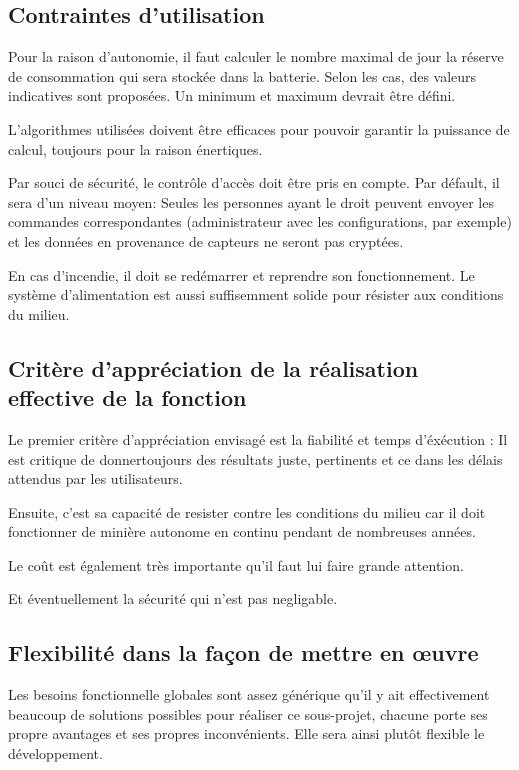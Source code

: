     \subsection{Contraintes d'utilisation}
    
		Pour la raison d'autonomie, il faut calculer le nombre maximal de jour la réserve de consommation qui sera stockée dans la batterie. Selon les cas, des valeurs indicatives sont proposées. Un minimum et maximum devrait être défini.  

		L'algorithmes utilisées doivent être efficaces pour pouvoir garantir la puissance de calcul, toujours pour la raison énertiques.
				
		Par souci de sécurité, le contrôle d’accès doit être pris en compte. Par défault, il sera d'un niveau moyen: Seules les personnes ayant le droit peuvent envoyer les commandes correspondantes (administrateur avec les configurations, par exemple) et les données en provenance de capteurs ne seront pas cryptées.
    
		En cas d'incendie, il doit se redémarrer et reprendre son fonctionnement. Le système d'alimentation est aussi suffisemment solide pour résister aux conditions du milieu.

    \subsection{Critère d'appréciation de la réalisation effective de la fonction} 
	Le premier critère d'appréciation envisagé est la fiabilité et temps d'éxécution : Il est critique de donnertoujours des résultats juste, pertinents et ce dans les délais attendus par les utilisateurs. 

	Ensuite, c'est sa capacité de resister contre les conditions du milieu car il doit fonctionner de minière autonome en continu pendant de nombreuses années.

	Le coût est également très importante qu'il faut lui faire grande attention.

	Et éventuellement la sécurité qui n'est pas negligable.
      
    \subsection{Flexibilité dans la façon de mettre en œuvre}
	Les besoins fonctionnelle globales sont assez générique qu'il y ait effectivement beaucoup de solutions possibles pour réaliser ce sous-projet, chacune porte ses propre avantages et ses propres inconvénients. Elle sera ainsi plutôt flexible le développement. 

